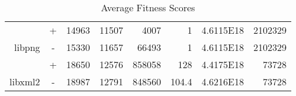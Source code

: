 \begin{table}[htb]
\begin{tabular}{|r|c|r|r|r|r|r|r|}
                               & +                                                                           &                          14963                                              &                          11507                                                &                          4007                                                &                     1                                                      &                          4.6115E18                                             &                          2102329                                                               \\ \cline{2-8} 
\multirow{-2}{*}{libpng}       & \cellcolor[HTML]{C0C0C0}-                                                   & \cellcolor[HTML]{C0C0C0} 15330                                              & \cellcolor[HTML]{C0C0C0} 11657                                                & \cellcolor[HTML]{C0C0C0}  66493                                              & \cellcolor[HTML]{C0C0C0}      1                                            & \cellcolor[HTML]{C0C0C0}              4.6115E18                                & \cellcolor[HTML]{C0C0C0} 2102329                                                               \\ \hline \hline
                               & +                                                                           &       18650                                                                 &                          12576                                                &                            858058                                            &                                      128                                   &                          4.4175E18                                             &                          73728                                                                 \\ \cline{2-8} 
\multirow{-2}{*}{libxml2}      & \cellcolor[HTML]{C0C0C0}-                                                   & \cellcolor[HTML]{C0C0C0}    18987                                           & \cellcolor[HTML]{C0C0C0} 12791                                                & \cellcolor[HTML]{C0C0C0}   848560                                            & \cellcolor[HTML]{C0C0C0}    104.4                                          & \cellcolor[HTML]{C0C0C0} 4.6216E18                                             & \cellcolor[HTML]{C0C0C0} 73728                                                                 \\ \hline
\end{tabular}
\caption{Average Fitness Scores}
\label{tbl:fitness}
\end{table}

